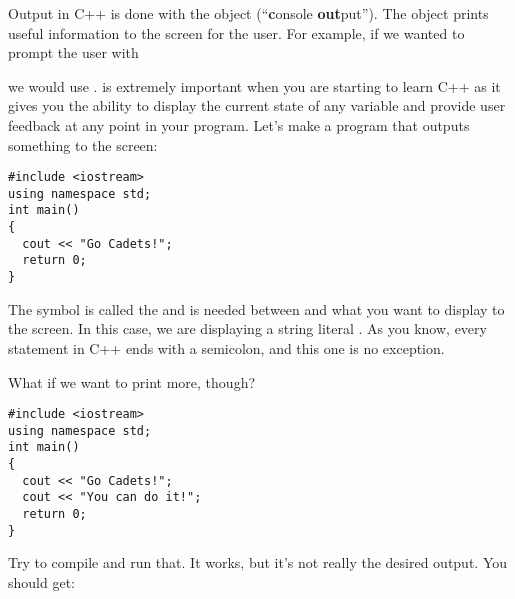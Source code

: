 
Output in C++ is done with the object  (``\textbf{c}onsole \textbf{out}put''). 
The object  prints useful information to the screen for the user. 
For example, if we wanted to prompt the user with 

\noindent {}

\noindent we would use . 
 is extremely important when you are starting to learn C++ as it gives you the ability to display the current state of any variable and provide user feedback at any point in your program. 
Let's make a program that outputs something to the screen:

\noindent\begin{minipage}{\linewidth}\begin{lstlisting}
#include <iostream>
using namespace std;
int main()
{
  cout << "Go Cadets!";
  return 0;
}
\end{lstlisting}\end{minipage}


The symbol \Code{<<} is called the  and is needed between  and what you want to display to the screen. 
In this case, we are displaying a string literal . 
As you know, every statement in C++ ends with a semicolon, and this one is no exception.

What if we want to print more, though?

\noindent\begin{minipage}{\linewidth}\begin{lstlisting}
#include <iostream>
using namespace std;
int main()
{
  cout << "Go Cadets!";
  cout << "You can do it!";
  return 0;
}
\end{lstlisting}\end{minipage}

Try to compile and run that. 
It works, but it's not really the desired output. 
You should get:

\noindent {}

